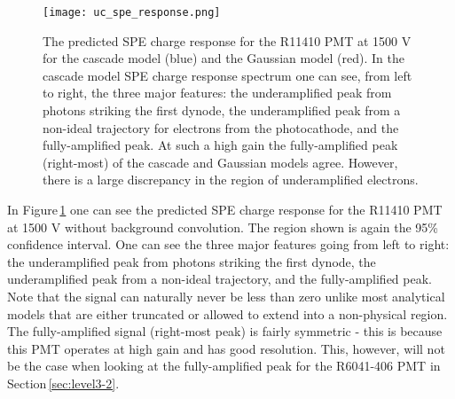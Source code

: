 \documentclass[11pt,a4paper]{article}
\newcommand\figref[1]{Figure\,\ref{#1}}
\newcommand\secref[1]{Section\,\ref{#1}}
\begin{document}



\begin{figure}[t]
\centering
\texttt{[image: uc\_spe\_response.png]}
\caption{The predicted SPE charge response for the R11410 PMT at 1500 V for the cascade model (blue) and the Gaussian model (red).  In the cascade model SPE charge response spectrum one can see, from left to right, the three major features: the underamplified peak from photons striking the first dynode, the underamplified peak from a non-ideal trajectory for electrons from the photocathode, and the fully-amplified peak.  At such a high gain the fully-amplified peak (right-most) of the cascade and Gaussian models agree.  However, there is a large discrepancy in the region of underamplified electrons.}
\label{fig:fig-2}
\end{figure}




In \figref{fig:fig-2} one can see the predicted SPE charge response for the R11410 PMT at 1500 V without background convolution.  The region shown is again the 95\% confidence interval.  One can see the three major features going from left to right: the underamplified peak from photons striking the first dynode, the underamplified peak from a non-ideal trajectory, and the fully-amplified peak.  Note that the signal can naturally never be less than zero unlike most analytical models that are either truncated or allowed to extend into a non-physical region.  The fully-amplified signal (right-most peak) is fairly symmetric - this is because this PMT operates at high gain and has good resolution.  This, however, will not be the case when looking at the fully-amplified peak for the R6041-406 PMT in \secref{sec:level3-2}.
\end{document}
